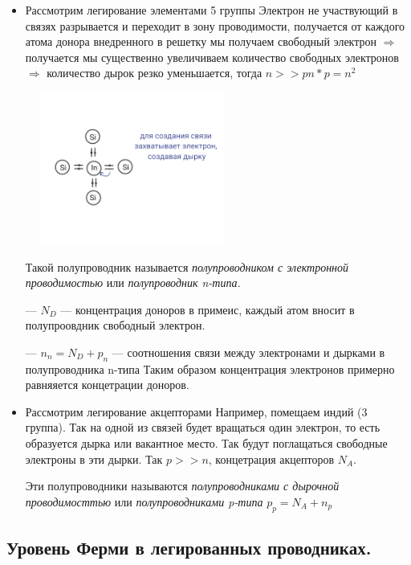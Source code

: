 \documentclass[../main.tex]{subfiles}
\begin{document}
\begin{itemize}
    \item Рассмотрим легирование элементами 5 группы
    Электрон не участвующий в связях разрывается и переходит в зону проводимости, получается от каждого атома донора внедренного в решетку мы получаем свободный электрон $\Rightarrow$ получается мы существенно 
увеличиваем количество свободных электронов $\Rightarrow$ количество дырок резко уменьшается, тогда $n >> p n * p = n^2$ 
\begin{center}
    \includegraphics[height=5cm, width=7cm]{../img/kvantovy26.png}
\end{center}
 Такой полупроводник называется \textit{полупроводником с электронной проводимостью} или \textit{полупроводник n-типа.}

--- $N_D$ --- концентрация доноров в примеис, каждый атом вносит в полупроовдник свободный электрон.

--- $n_n = N_D +p_n$ --- соотношения связи между электронами и дырками в полупроводника n-типа
 Таким образом концентрация электронов примерно равняяется концетрации доноров.

    \item Рассмотрим легирование акцепторами
    Например, помещаем индий (3 группа).
    Так на одной из связей будет вращаться один электрон, то есть образуется дырка или вакантное место. Так будут поглащаться свободные электроны в эти дырки.
    Так $p >> n$, концетрация акцепторов $N_A$. 
    
 Эти полупроводники называются \textit{полупроводниками с дырочной проводимосттью} или \textit{полупроводниками p-типа} $p_p = N_A + n_p$

\end{itemize}

\subsection{Уровень Ферми в легированных проводниках.}
\end{document}
